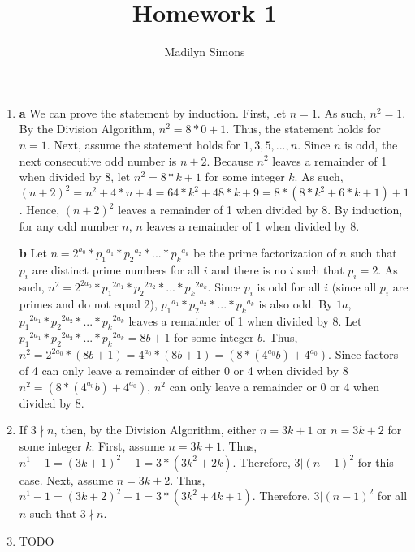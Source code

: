 \documentclass{article}
\title{Homework 1}
\author{Madilyn Simons}
\date{}
\begin{document}
\maketitle

\begin{enumerate}

\item \textbf{a} We can prove the statement by induction.  First, let $n = 1$.  As such, $n^2 = 1$.  By the Division Algorithm, $n^2 = 8*0 + 1$.  Thus, the statement holds for $n = 1$.  Next, assume the statement holds for $1, 3, 5, ..., n$.  Since $n$ is odd, the next consecutive odd number is $n+2$.  Because $n^2$ leaves a remainder of 1 when divided by 8, let $n^2 = 8*k + 1$ for some integer $k$.  As such, $(n+2)^2 = n^2 + 4*n + 4 = 64*k^2 + 48*k + 9 = 8 * (8*k^2 + 6*k + 1) + 1$.  Hence, $(n+2)^2$ leaves a remainder of 1 when divided by 8.  By induction, for any odd number $n$, $n$ leaves a remainder of 1 when divided by 8.

\textbf{b} Let $n = 2^{a_0} * {p_1}^{a_1} * {p_2}^{a_2} * ... * {p_k}^{a_k}$ be the prime factorization of $n$ such that $p_i$ are distinct prime numbers for all $i$ and there is no $i$ such that $p_i = 2$.  As such, $n^2 = 2^{2a_0} * {p_1}^{2a_1} * {p_2}^{2a_2} * ... * {p_k}^{2a_k}$.  Since $p_i$ is odd for all $i$ (since all $p_i$ are primes and do not equal 2), ${p_1}^{a_1} * {p_2}^{a_2} * ... * {p_k}^{a_k}$ is also odd.  By $1a$, ${p_1}^{2a_1} * {p_2}^{2a_2} * ... * {p_k}^{2a_k}$ leaves a remainder of 1 when divided by 8.  Let ${p_1}^{2a_1} * {p_2}^{2a_2} * ... * {p_k}^{2a_k} = 8b + 1$ for some integer $b$.  Thus, $n^2 = 2^{2a_0} * (8b + 1) = 4^{a_0} * (8b + 1) = (8 * (4^{a_0}b) + 4^{a_0}).$  Since factors of 4 can only leave a remainder of either 0 or 4 when divided by 8 $n^2 = (8 * (4^{a_0}b) + 4^{a_0})$, $n^2$ can only leave a remainder or 0 or 4 when divided by 8.

\item \textbf{} If $3 \nmid n$, then, by the Division Algorithm, either $n = 3k + 1$ or $n = 3k + 2$ for some integer $k$.  First, assume $n = 3k + 1$.  Thus, $n^1 - 1 = (3k + 1)^2 - 1 = 3 * (3k^2 + 2k)$.  Therefore, $3 \vert (n - 1)^2$ for this case.  Next, assume $n = 3k + 2$.  Thus, $n^1 - 1 = (3k + 2)^2 - 1 = 3 * (3k^2 + 4k + 1)$.  Therefore, $3 \vert (n - 1)^2$ for all $n$ such that $3 \nmid n$.

\item \textbf{} TODO

\end{enumerate}
\end{document}
